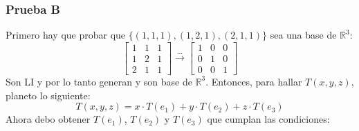 \documentclass[a4paper,12pt]{article}
\begin{document}
\subsubsection{Prueba B}
Primero hay que probar que $\{ (1,1,1), (1,2,1), (2,1,1) \}$ sea una base de $\mathds{R}^3$:
$$
\begin{bmatrix}
    1 & 1 & 1 \\
    1 & 2 & 1 \\
    2 & 1 & 1
\end{bmatrix} 
\xrightarrow[]{\ldots}
\begin{bmatrix}
    1 & 0 & 0 \\
    0 & 1 & 0 \\
    0 & 0 & 1
\end{bmatrix}
$$
Son LI y por lo tanto generan y son base de $\mathds{R}^3$. Entonces, para hallar $T(x,y,z)$, planeto lo siguiente:
$$
T(x,y,z)= x\cdot T(e_1) + y\cdot T(e_2) + z\cdot T(e_3)
$$
Ahora debo obtener $T(e_1)$, $T(e_2)$ y $T(e_3)$ que cumplan las condiciones:
\end{document}
